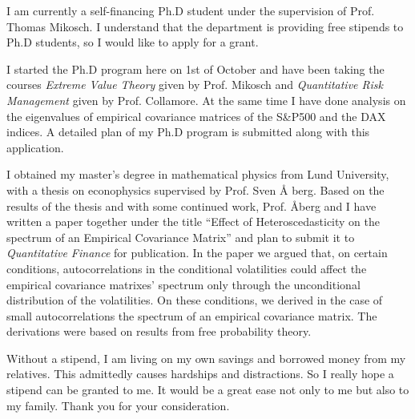 \documentclass[10pt,stdletter,dateno,sigleft]{newlfm} %
\begin{document}
\begin{newlfm}
I am currently a self-financing Ph.D student under the supervision of
Prof. Thomas Mikosch. I understand that the department is providing
free stipends to Ph.D students, so I would like to apply for a grant.

I started the Ph.D program here on 1st of October and have been taking
the courses {\it Extreme Value Theory} given by Prof. Mikosch and {\it
  Quantitative Risk Management} given by Prof. Collamore. At the same
time I have done analysis on the eigenvalues of empirical covariance
matrices of the S\&P500 and the DAX indices. A detailed plan of my
Ph.D program is submitted along with this application.

I obtained my master's degree in mathematical physics from Lund
University, with a thesis on econophysics supervised by Prof. Sven \AA
berg. Based on the results of the thesis and with some continued work,
Prof. \AA berg and I have written a paper together under the title
``Effect of Heteroscedasticity on the spectrum of an Empirical
Covariance Matrix'' and plan to submit it to {\it Quantitative
  Finance} for publication. In the paper we argued that, on certain
conditions, autocorrelations in the conditional volatilities could
affect the empirical covariance matrixes' spectrum only through the
unconditional distribution of the volatilities. On these
conditions, we derived in the case of small autocorrelations the
spectrum of an empirical covariance matrix. The derivations were based
on results from free probability theory.

Without a stipend, I am living on my own savings and borrowed money
from my relatives. This admittedly causes hardships and
distractions. So I really hope a stipend can be granted to me. It
would be a great ease not only to me but also to my family. Thank you
for your consideration.

\end{newlfm}
\end{document}
